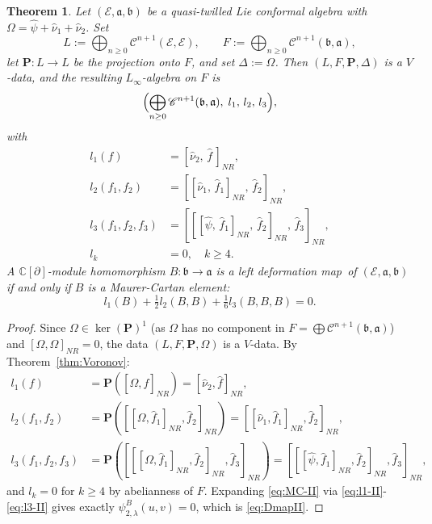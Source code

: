 \documentclass[a4paper,11pt]{article}
\def\Rg{\mathbb{C}[\partial]}
\def\Ep{\mathcal{E}}
\def\Vs{\mathfrak{a}}
\def\Ws{\mathfrak{b}}
\def\str{\Omega}
\def\smu{\widehat{\nu}_1}
\def\smv{\widehat{\nu}_2}
\def\shf{\widehat{\psi}}
\def\Cch{\mathscr{C}}
\def\la{\lambda}
\numberwithin{equation}{section}
\newtheorem{theorem}{Theorem}[section]
\begin{document}
\begin{theorem}\label{thm:control-II}
Let $(\Ep,\Vs,\Ws)$ be a quasi-twilled Lie conformal  algebra with
$\str=\shf+\smu+\smv$.  Set
\[
  L := \bigoplus_{n\geq0}\Cch^{n+1}(\Ep,\Ep), \qquad
  F := \bigoplus_{n\geq0}\Cch^{n+1}(\Ws,\Vs),
\]
let $\mathbf{P}:L\to L$ be the projection onto $F$, and set
$\Delta:=\str$.  Then $(L,F,\mathbf{P},\Delta)$ is a $V$-data, and
the resulting $L_\infty$-algebra on $F$ is
\[
  \Bigl(\bigoplus_{n\geq0}\Cch^{n+1}(\Ws,\Vs),\; l_1,\, l_2,\, l_3\Bigr),
\]
with
\begin{align}
  l_1(f)
  &= [\smv,\,\widehat{f}\,]_{NR},
  \label{eq:l1-II}\\
  l_2(f_1,f_2)
  &= [[\smu,\,\widehat{f}_1]_{NR},\,\widehat{f}_2]_{NR},
  \label{eq:l2-II}\\
  l_3(f_1,f_2,f_3)
  &= [[[\shf,\,\widehat{f}_1]_{NR},\,\widehat{f}_2]_{NR},\,\widehat{f}_3]_{NR},
  \label{eq:l3-II}\\
  l_k &= 0, \quad k\geq4.
\end{align}
A $\Rg$-module homomorphism $B:\Ws\to\Vs$ is a left deformation map\ of
$(\Ep,\Vs,\Ws)$ if and only if $B$ is a Maurer-Cartan element:
\begin{equation}\label{eq:MC-II}
  l_1(B) + \tfrac{1}{2}l_2(B,B) + \tfrac{1}{6}l_3(B,B,B) = 0.
\end{equation}
\end{theorem}
 
\begin{proof}
Since $\str\in\ker(\mathbf{P})^1$ (as $\str$ has no component in
$F=\bigoplus\Cch^{n+1}(\Ws,\Vs)$) and $[\str,\str]_{NR}=0$, the data
$(L,F,\mathbf{P},\str)$ is a $V$-data.  By Theorem~\ref{thm:Voronov}:
\begin{align*}
  l_1(f) &= \mathbf{P}([\str,\widehat{f}]_{NR}) = [\smv,\widehat{f}]_{NR},\\
  l_2(f_1,f_2) &= \mathbf{P}([[\str,\widehat{f}_1]_{NR},\widehat{f}_2]_{NR})
               = [[\smu,\widehat{f}_1]_{NR},\widehat{f}_2]_{NR},\\
  l_3(f_1,f_2,f_3) &= \mathbf{P}([[[\str,\widehat{f}_1]_{NR},\widehat{f}_2]_{NR},
               \widehat{f}_3]_{NR})
               = [[[\shf,\widehat{f}_1]_{NR},\widehat{f}_2]_{NR},\widehat{f}_3]_{NR},
\end{align*}
and $l_k=0$ for $k\geq4$ by abelianness of $F$.  Expanding
\eqref{eq:MC-II} via \eqref{eq:l1-II}-\eqref{eq:l3-II} gives exactly
$\psi^B_{2,\la}(u,v)=0$, which is \eqref{eq:DmapII}.
\end{proof}
 
\end{document}
